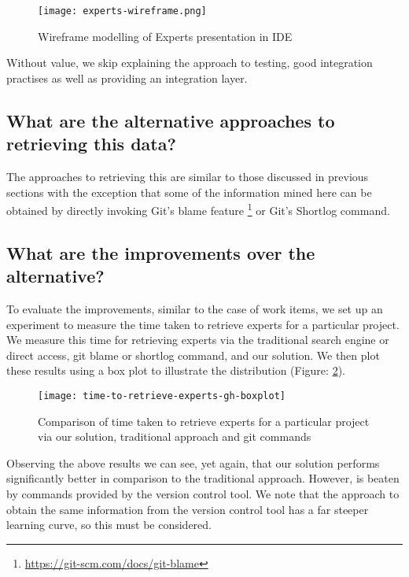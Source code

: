 \begin{figure}[h!]
	\centering
	\texttt{[image: experts-wireframe.png]}
	\caption{Wireframe modelling of Experts presentation in IDE}
	\label{fig:expertsWireframe}
\end{figure}

Without value, we skip explaining the approach to testing, good integration practises as well as providing an integration layer.

\subsection{What are the alternative approaches to retrieving this data?}

The approaches to retrieving this are similar to those discussed in previous sections with the exception that some of the information mined here can be obtained by directly invoking Git's blame feature \footnote{\url{https://git-scm.com/docs/git-blame}} or Git's Shortlog command.

\subsection{What are the improvements over the alternative?}

To evaluate the improvements, similar to the case of work items, we set up an experiment to measure the time taken to retrieve experts for a particular project. We measure this time for retrieving experts via the traditional search engine or direct access, git blame or shortlog command, and our solution. We then plot these results using a box plot to illustrate the distribution (Figure: \ref{fig:time-to-retrieve-experts-gh-boxplot}).

\begin{figure}[h!]
	\centering
	\texttt{[image: time-to-retrieve-experts-gh-boxplot]}
	\caption{Comparison of time taken to retrieve experts for a particular project via our solution, traditional approach and git commands}
	\label{fig:time-to-retrieve-experts-gh-boxplot}
\end{figure}

Observing the above results we can see, yet again, that our solution performs significantly better in comparison to the traditional approach. However, is beaten by commands provided by the version control tool. We note that the approach to obtain the same information from the version control tool has a far steeper learning curve, so this must be considered.

